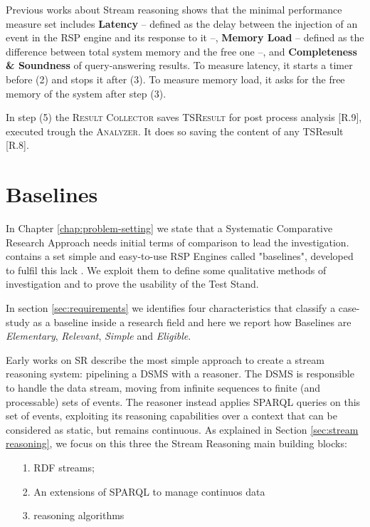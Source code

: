 Previous works about Stream reasoning \cite{} shows that the minimal performance measure set includes \textbf{Latency} -- defined as the delay between the injection of an event in the RSP engine and its response to it --, \textbf{Memory Load} -- defined as the difference between total system memory and the free one --, and \textbf{Completeness \& Soundness} of query-answering results. To measure latency, it starts a timer before (2) and stops it after (3). To measure memory load, it asks for the free memory of the system after step (3).

In step (5) the \textsc{Result Collector} saves \textsc{TSResult} for post process analysis [R.9], executed trough the \textsc{Analyzer}. It does so saving the content of any TSResult  [R.8].

\section{Baselines}
\label{sec:baselines}

\noindent In Chapter \ref{chap:problem-setting} we state that a Systematic Comparative Research Approach needs initial terms of comparison to lead the investigation. \name contains a set simple and easy-to-use RSP Engines called "baselines", developed to fulfil this lack . 
We exploit them to define some qualitative methods of investigation and to prove the usability of the Test Stand. 

In section \ref{sec:requirements} we identifies four characteristics that classify a case-study as a baseline inside a research field and here we report how \name Baselines are \textit{Elementary}, \textit{Relevant}, \textit{Simple} and \textit{Eligible}.

Early works on SR \cite{DBLP:conf/fis/ValleCBBC08,Walavalkar08streamingknowledge} describe the most simple approach to create a stream reasoning system: pipelining a DSMS with a reasoner. The DSMS is responsible to handle the data stream, moving from infinite sequences to finite (and processable) sets of events. The reasoner instead applies SPARQL queries on this set of events, exploiting its reasoning capabilities over a context that can be considered as static, but remains continuous.  As explained in Section \ref{sec:stream reasoning}, we focus on this three the Stream Reasoning main building blocks: \begin{enumerate}
\item[1.] RDF streams;
\item[2.] An extensions of SPARQL to manage continuos data
\item[3.] reasoning algorithms
\end{enumerate}


